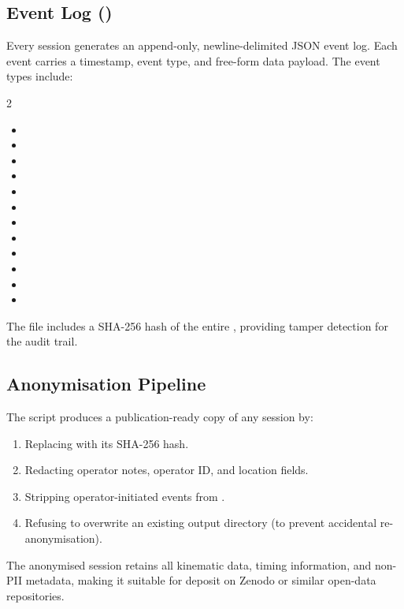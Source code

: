 \subsection{Event Log ()}

Every session generates an append-only, newline-delimited JSON event log.
Each event carries a timestamp, event type, and free-form data payload.
The event types include:
\begin{multicols}{2}
\begin{itemize}[nosep]
  \item {}
  \item {}
  \item {}
  \item {}
  \item {}
  \item {}
  \item {}
  \item {}
  \item {}
  \item {}
  \item {}
  \item {}
\end{itemize}
\end{multicols}

The  file includes a SHA-256 hash of the entire , providing tamper detection for the audit trail.


\subsection{Anonymisation Pipeline}

The  script produces a publication-ready copy of any session by:
\begin{enumerate}[nosep]
  \item Replacing  with its SHA-256 hash.
  \item Redacting operator notes, operator ID, and location fields.
  \item Stripping operator-initiated events from .
  \item Refusing to overwrite an existing output directory (to prevent accidental re-anonymisation).
\end{enumerate}

The anonymised session retains all kinematic data, timing information, and non-PII metadata, making it suitable for deposit on Zenodo or similar open-data repositories.
